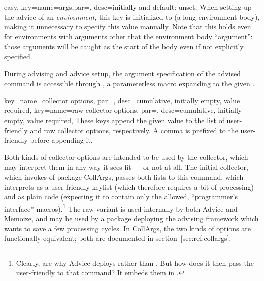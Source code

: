 \documentclass[a4paper,11pt]{article}
\begin{document}
\begin{doc}{easy,
    key={name=args,par=, desc=initially and default: unset},
  }
  When setting up the advice of an \emph{environment}, this key is
  initialized to  (a long environment body),
  making it unnecessary to specify this value manually.  Note that this holds
  even for environments with arguments other that the environment body
  ``argument'': those arguments will be caught as the start of the body even if
  not explicitly specified.
  
  During advising and advice setup, the argument specification of the advised
  command is accessible through , a parameterless macro
  expanding to the given .
\end{doc}


\begin{doc}{
    key={name=collector options, par=,
      desc={cumulative, initially empty, value required}},
    key={name=raw collector options, par=, 
      desc={cumulative, initially empty, value required}},
  }
  These keys append the given value to the list of user-friendly and raw
  collector options, respectively.  A comma is prefixed to the user-friendly
   before appending it.

  Both kinds of collector options are intended to be used by the collector,
  which may interpret them in any way it sees fit --- or not at all.  The
  initial collector, which invokes  of package
  CollArgs, passes both lists to this command, which interprets
   as a user-friendly  keylist
  (which therefore requires a bit of processing) and  as plain  code (expecting it to contain only the
  allowed, ``programmer's interface'' macros).\footnote{Clearly,
     are why Advice deploys
     rather than .  But
    how does it then pass the user-friendly  to
    that command? It embeds them in .}  The raw variant is
  used internally by both Advice and Memoize, and may be used by a package
  deploying the advising framework which wants to save a few processing cycles.
  In CollArgs, the two kinds of options are functionally equivalent; both are
  documented in section~\ref{sec:ref:collargs}.


\end{doc}
\end{document}
